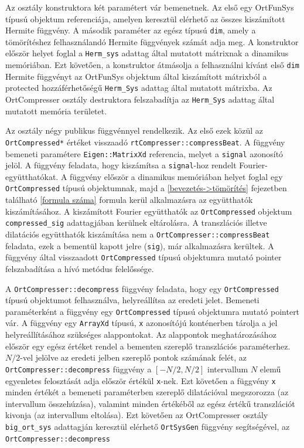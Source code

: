 \documentclass[oneside,titlepage,12pt,a4paper]{report}
\begin{document}
\par Az osztály konstruktora két paramétert vár bemenetnek. Az első egy OrtFunSys típusú objektum referenciája, amelyen keresztül elérhető az összes kiszámított Hermite függvény. A második paraméter az egész típusú \texttt{dim}, amely a tömörítéshez felhasználandó Hermite függvények számát adja meg. A konstruktor először helyet foglal a \texttt{Herm\_sys} adattag által mutatott mátrixnak a dinamikus memóriában. Ezt követően, a konstruktor átmásolja a felhasználni kívánt első \texttt{dim} Hermite függvényt az OrtFunSys objektum által kiszámított mátrixból a protected hozzáférhetőségű \texttt{Herm\_Sys} adattag által mutatott mátrixba. Az OrtCompresser osztály destruktora felszabadítja az \texttt{Herm\_Sys} adattag által mutatott memória területet. 
\par Az osztály négy publikus függvénnyel rendelkezik. Az első ezek közül az \texttt{OrtCompressed*} értéket visszaadó \texttt{rtCompresser::compressBeat}. A függvény bemeneti paramétere \texttt{Eigen::MatrixXd} referencia, melyet a \texttt{signal} azonosító jelöl. A függvény feladata, hogy kiszámítsa a \texttt{signal}-hoz rendelt Fourier-együtthatókat. A függvény először a dinamikus memóriában helyet foglal egy \texttt{OrtCompressed} típusú objektumnak, majd a \ref{bevezetés->tömörítés} fejezetben található \ref{formula száma} formula kerül alkalmazásra az együtthatók kiszámításához. A kiszámított Fourier együtthatók az \texttt{OrtCompressed} objektum \texttt{compressed\_sig} adattagjában kerülnek eltárolásra. A transzlációs illetve dilatációs együtthatók kiszámítása nem a \texttt{OrtCompresser::compressBeat} feladata, ezek a bementül kapott jelre (\texttt{sig}), már alkalmazásra kerültek. A függvény által visszaadott \texttt{OrtCompressed} típusú objektumra mutató pointer felszabadítása a hívó metódus felelőssége. 
\par A \texttt{OrtCompresser::decompress} függvény feladata, hogy egy \texttt{OrtCompressed} típusú objektumot felhasználva, helyreállítsa az eredeti jelet. Bemeneti paraméterként a függvény egy \texttt{OrtCompressed} típusú objektumra mutató pointert vár. A függvény egy \texttt{ArrayXd} típusú, \texttt{x} azonosítójú konténerben tárolja a jel helyreállításához szükséges alappontokat. Az alappontok meghatározásához először egy egész értéket rendel a bementen szereplő transzlációs paraméterhez. $N/2$-vel jelölve az eredeti jelben szereplő pontok számának felét, az \texttt{OrtCompresser::decompress} függvény a $[-N/2, N/2]$ intervallum $N$ elemű egyenletes felosztását adja először értékül \texttt{x}-nek. Ezt követően a függvény \texttt{x} minden értékét a bemeneti paraméterben szereplő dilatációval megszorozza (az intervallum összehúzása), valamint minden értékéből az egész értékű transzlációt kivonja (az intervallum eltolása). Ezt követően az OrtCompresser osztály \texttt{big\_ort\_sys} adattagján keresztül elérhető \texttt{OrtSysGen} függvény segítségével, az  \texttt{OrtCompresser::decompress}
\end{document}

